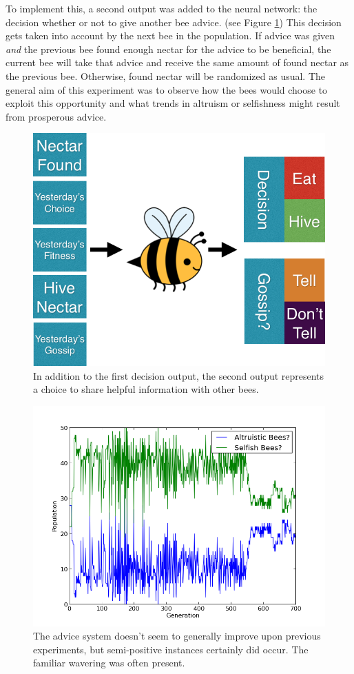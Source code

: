 \documentclass[twoside]{article}
\begin{document}
\begin{multicols}{2}
			To implement this, a second output was added to the neural network: the decision whether or not to give another bee advice. (see Figure \ref{fig:gossip_system}) This decision gets taken into account by the next bee in the population. If advice was given \emph{and} the previous bee found enough nectar for the advice to be beneficial, the current bee will take that advice and receive the same amount of found nectar as the previous bee. Otherwise, found nectar will be randomized as usual. The general aim of this experiment was to observe how the bees would choose to exploit this opportunity and what trends in altruism or selfishness might result from prosperous advice.


			\begin{figure}[H]
				\begin{center}
					\includegraphics[width=.45\textwidth]{bee_diagrams/gossip_system.png}
				\end{center}
				\caption{In addition to the first decision output, the second output represents a choice to share helpful information with other bees.}
				\label{fig:gossip_system}
			\end{figure}

                        \begin{figure}[H]
				\begin{center}
					\includegraphics[width=.5\textwidth]{results/gossip_plot_twist_comp.png}
				\end{center}
				\caption{The advice system doesn't seem to generally improve upon previous experiments, but semi-positive instances certainly did occur. The familiar wavering was often present.}
				\label{fig:gossip_composition}
			\end{figure}


\end{multicols}
\end{document}
